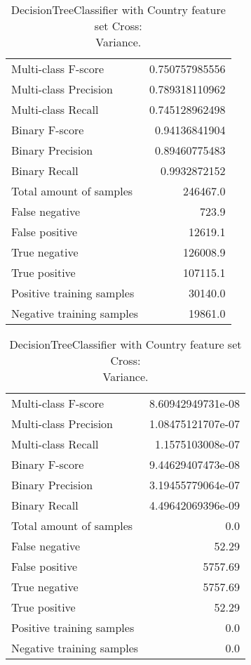 \begin{table}[H]
\begin{minipage}{0.5\textwidth}
\caption{DecisionTreeClassifier with Country feature set Cross: \\Average.}
\centering
\begin{tabular}{l r}
\toprule
Multi-class F-score & 0.750757985556 \\
Multi-class Precision & 0.789318110962 \\
Multi-class Recall & 0.745128962498 \\
\midrule
Binary F-score & 0.94136841904 \\
Binary Precision & 0.89460775483 \\
Binary Recall & 0.9932872152 \\
\midrule
Total amount of samples & 246467.0 \\
False negative & 723.9 \\
False positive & 12619.1 \\
True negative & 126008.9 \\
True positive & 107115.1 \\
\midrule
Positive training samples & 30140.0 \\
Negative training samples & 19861.0 \\
\bottomrule
\end{tabular}
\end{minipage}
\hfillx
\begin{minipage}{0.5\textwidth}

\caption{DecisionTreeClassifier with Country feature set Cross: \\Variance.}
\centering
\begin{tabular}{l r}
\toprule
Multi-class F-score & 8.60942949731e-08 \\
Multi-class Precision & 1.08475121707e-07 \\
Multi-class Recall & 1.1575103008e-07 \\
\midrule
Binary F-score & 9.44629407473e-08 \\
Binary Precision & 3.19455779064e-07 \\
Binary Recall & 4.49642069396e-09 \\
\midrule
Total amount of samples & 0.0 \\
False negative & 52.29 \\
False positive & 5757.69 \\
True negative & 5757.69 \\
True positive & 52.29 \\
\midrule
Positive training samples & 0.0 \\
Negative training samples & 0.0 \\
\bottomrule
\end{tabular}
\end{minipage}
\end{table}
